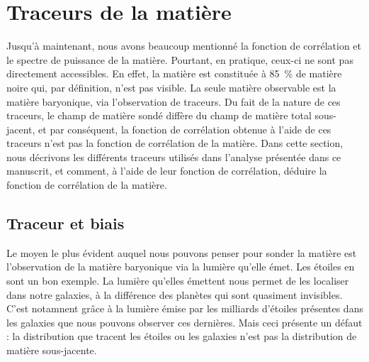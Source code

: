 \documentclass[11pt, twoside, a4paper, openright]{report}
\begin{document}
\section{Traceurs de la matière}
Jusqu'à maintenant, nous avons beaucoup mentionné la fonction de corrélation et le spectre de puissance de la matière.
Pourtant, en pratique, ceux-ci ne sont pas directement accessibles.
En effet, la matière est constituée à \SI{85}{\percent} de matière noire qui, par définition, n'est pas visible. La seule matière observable est la matière baryonique, via l'observation de traceurs. Du fait de la nature de ces traceurs, le champ de matière sondé diffère du champ de matière total sous-jacent, et par conséquent, la fonction de corrélation obtenue à l'aide de ces traceurs n'est pas la fonction de corrélation de la matière. Dans cette section, nous décrivons les différents traceurs utilisés dans l'analyse présentée dans ce manuscrit, et comment, à l'aide de leur fonction de corrélation, déduire la fonction de corrélation de la matière.


\subsection{Traceur et biais}
Le moyen le plus évident auquel nous pouvons penser pour sonder la matière est l'observation de la matière baryonique via la lumière qu'elle émet. Les étoiles en sont un bon exemple. La lumière qu'elles émettent nous permet de les localiser dans notre galaxies, à la différence des planètes qui sont quasiment invisibles. C'est notamnent grâce à la lumière émise par les milliards d'étoiles présentes dans les galaxies que nous pouvons observer ces dernières. Mais ceci présente un défaut : la distribution que tracent les étoiles ou les galaxies n'est pas la distribution de matière sous-jacente.
\end{document}
